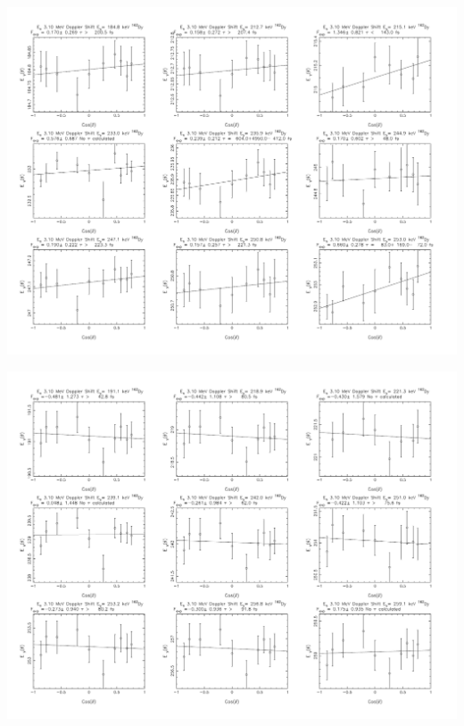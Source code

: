 \begin{center}
\includegraphics[page=24,angle=90,height=0.95\textheight]{162Dy_ftau_310_ME_n.pdf}
\end{center}
\begin{center}
\includegraphics[page=24,angle=90,height=0.95\textheight]{162Dy_ftau_310_HE_n.pdf}
\end{center}
